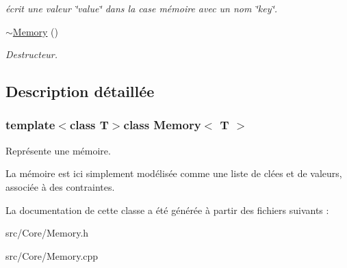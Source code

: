 \begin{DoxyCompactItemize}
\begin{DoxyCompactList}\small\item\em écrit une valeur \char`\"{}value\char`\"{} dans la case mémoire avec un nom \char`\"{}key\char`\"{}. \end{DoxyCompactList}\item 
\hypertarget{classMemory_a2d153fdede89954dc0875ab6c8d804c3}{\hyperlink{classMemory_a2d153fdede89954dc0875ab6c8d804c3}{$\sim$\-Memory} ()}\label{classMemory_a2d153fdede89954dc0875ab6c8d804c3}

\begin{DoxyCompactList}\small\item\em Destructeur. \end{DoxyCompactList}\end{DoxyCompactItemize}


\subsection{Description détaillée}
\subsubsection*{template$<$class T$>$class Memory$<$ T $>$}

Représente une mémoire. 

La mémoire est ici simplement modélisée comme une liste de clées et de valeurs, associée à des contraintes. 

La documentation de cette classe a été générée à partir des fichiers suivants \-:\begin{DoxyCompactItemize}
\item 
src/\-Core/Memory.\-h\item 
src/\-Core/Memory.\-cpp\end{DoxyCompactItemize}
